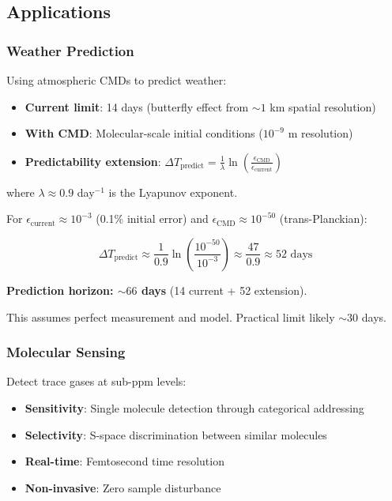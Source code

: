 \subsection{Applications}

\subsubsection{Weather Prediction}

Using atmospheric CMDs to predict weather:

\begin{itemize}
\item \textbf{Current limit}: 14 days (butterfly effect from $\sim 1$ km spatial resolution)
\item \textbf{With CMD}: Molecular-scale initial conditions ($10^{-9}$ m resolution)
\item \textbf{Predictability extension}: $\Delta T_{\text{predict}} = \frac{1}{\lambda}\ln\left(\frac{\epsilon_{\text{CMD}}}{\epsilon_{\text{current}}}\right)$
\end{itemize}

where $\lambda \approx 0.9$ day$^{-1}$ is the Lyapunov exponent.

For $\epsilon_{\text{current}} \approx 10^{-3}$ (0.1\% initial error) and $\epsilon_{\text{CMD}} \approx 10^{-50}$ (trans-Planckian):

\begin{equation}
\Delta T_{\text{predict}} \approx \frac{1}{0.9}\ln\left(\frac{10^{-50}}{10^{-3}}\right) \approx \frac{47}{0.9} \approx 52 \text{ days}
\end{equation}

\textbf{Prediction horizon: $\sim 66$ days} (14 current + 52 extension).

This assumes perfect measurement and model. Practical limit likely $\sim 30$ days.

\subsubsection{Molecular Sensing}

Detect trace gases at sub-ppm levels:

\begin{itemize}
\item \textbf{Sensitivity}: Single molecule detection through categorical addressing
\item \textbf{Selectivity}: S-space discrimination between similar molecules
\item \textbf{Real-time}: Femtosecond time resolution
\item \textbf{Non-invasive}: Zero sample disturbance
\end{itemize}

